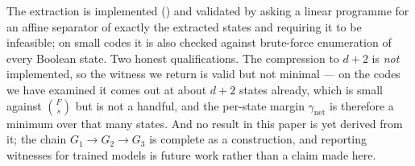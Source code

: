 The extraction is implemented () and validated by
asking a linear programme for an affine separator of exactly the extracted states and requiring
it to be infeasible; on small codes it is also checked against brute-force enumeration of every
Boolean state. Two honest qualifications. The compression to $d+2$ is \emph{not} implemented, so
the witness we return is valid but not minimal --- on the codes we have examined it comes out at
about $d+2$ states already, which is small against $\binom{F}{s}$ but is not a handful, and the
per-state margin $\gamma_{\mathrm{net}}$ is therefore a minimum over that many states. And no
result in this paper is yet derived from it; the chain
$G_1\to G_2\to G_3$ is complete as a construction, and reporting witnesses for trained models is
future work rather than a claim made here.

